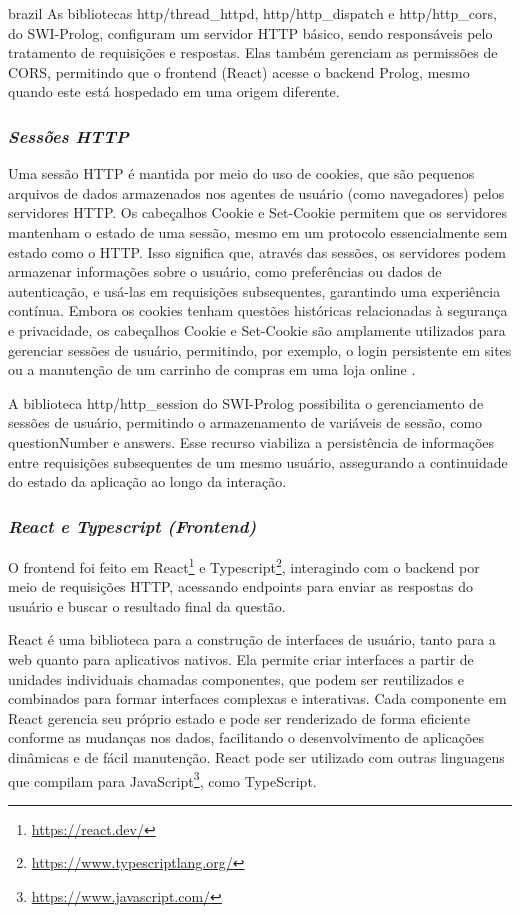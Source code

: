 \begin{otherlanguage*}{brazil}
As bibliotecas http/thread\_httpd, http/http\_dispatch e http/http\_cors, do SWI-Prolog, configuram um servidor HTTP básico, sendo responsáveis pelo tratamento de requisições e respostas. Elas também gerenciam as permissões de CORS, permitindo que o frontend (React) acesse o backend Prolog, mesmo quando este está hospedado em uma origem diferente.

\subsubsection{\textbf{\textit{Sessões HTTP}}}

Uma sessão HTTP é mantida por meio do uso de cookies, que são pequenos arquivos de dados armazenados nos agentes de usuário (como navegadores) pelos servidores HTTP. Os cabeçalhos Cookie e Set-Cookie permitem que os servidores mantenham o estado de uma sessão, mesmo em um protocolo essencialmente sem estado como o HTTP. Isso significa que, através das sessões, os servidores podem armazenar informações sobre o usuário, como preferências ou dados de autenticação, e usá-las em requisições subsequentes, garantindo uma experiência contínua. Embora os cookies tenham questões históricas relacionadas à segurança e privacidade, os cabeçalhos Cookie e Set-Cookie são amplamente utilizados para gerenciar sessões de usuário, permitindo, por exemplo, o login persistente em sites ou a manutenção de um carrinho de compras em uma loja online \cite{whatissession}.

A biblioteca http/http\_session do SWI-Prolog possibilita o gerenciamento de sessões de usuário, permitindo o armazenamento de variáveis de sessão, como questionNumber e answers. Esse recurso viabiliza a persistência de informações entre requisições subsequentes de um mesmo usuário, assegurando a continuidade do estado da aplicação ao longo da interação.

\subsubsection{\textbf{\textit{React e Typescript (Frontend)}}}

O frontend foi feito em React\footnote{\url{https://react.dev/}} e Typescript\footnote{\url{https://www.typescriptlang.org/}}, interagindo com o backend por meio de requisições HTTP, acessando endpoints para enviar as respostas do usuário e buscar o resultado final da questão.

React é uma biblioteca para a construção de interfaces de usuário, tanto para a web quanto para aplicativos nativos. Ela permite criar interfaces a partir de unidades individuais chamadas componentes, que podem ser reutilizados e combinados para formar interfaces complexas e interativas. Cada componente em React gerencia seu próprio estado e pode ser renderizado de forma eficiente conforme as mudanças nos dados, facilitando o desenvolvimento de aplicações dinâmicas e de fácil manutenção. React pode ser utilizado com outras linguagens que compilam para JavaScript\footnote{\url{https://www.javascript.com/}}, como TypeScript.


\end{otherlanguage*}

